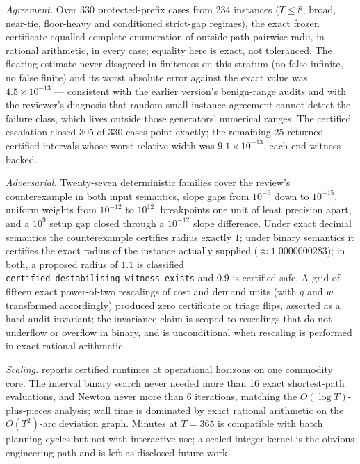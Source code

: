 \documentclass[11pt]{article}
\theoremstyle{definition}
\begin{document}
\emph{Agreement.} Over 330 protected-prefix cases from 234 instances ($T\le8$, broad, near-tie, floor-heavy and conditioned strict-gap regimes), the exact frozen certificate equalled complete enumeration of outside-path pairwise radii, in rational arithmetic, in every case; equality here is exact, not toleranced. The floating estimate never disagreed in finiteness on this stratum (no false infinite, no false finite) and its worst absolute error against the exact value was $4.5\times10^{-13}$ --- consistent with the earlier version's benign-range audits and with the reviewer's diagnosis that random small-instance agreement cannot detect the failure class, which lives outside those generators' numerical ranges. The certified escalation closed 305 of 330 cases point-exactly; the remaining 25 returned certified intervals whose worst relative width was $9.1\times10^{-13}$, each end witness-backed.

\emph{Adversarial.} Twenty-seven deterministic families cover the review's counterexample in both input semantics, slope gaps from $10^{-3}$ down to $10^{-15}$, uniform weights from $10^{-12}$ to $10^{12}$, breakpoints one unit of least precision apart, and a $10^9$ setup gap closed through a $10^{-12}$ slope difference. Under exact decimal semantics the counterexample certifies radius exactly $1$; under binary semantics it certifies the exact radius of the instance actually supplied ($\approx1.0000000283$); in both, a proposed radius of $1.1$ is classified \texttt{certified\_destabilising\_witness\_exists} and $0.9$ is certified safe. A grid of fifteen exact power-of-two rescalings of cost and demand units (with $q$ and $w$ transformed accordingly) produced zero certificate or triage flips, asserted as a hard audit invariant; the invariance claim is scoped to rescalings that do not underflow or overflow in binary, and is unconditional when rescaling is performed in exact rational arithmetic.

\emph{Scaling.}  reports certified runtimes at operational horizons on one commodity core. The interval binary search never needed more than 16 exact shortest-path evaluations, and Newton never more than 6 iterations, matching the $O(\log T)$-plus-pieces analysis; wall time is dominated by exact rational arithmetic on the $O(T^2)$-arc deviation graph. Minutes at $T=365$ is compatible with batch planning cycles but not with interactive use; a scaled-integer kernel is the obvious engineering path and is left as disclosed future work.
\end{document}
